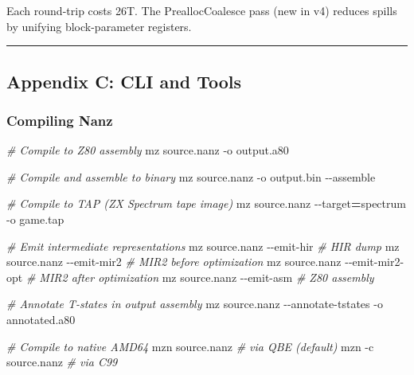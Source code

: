\documentclass[
  11pt,
]{article}
\newenvironment{Shaded}{\begin{snugshade}}{\end{snugshade}}
\newcommand{\AttributeTok}[1]{\textcolor[rgb]{0.13,0.29,0.53}{#1}}
\newcommand{\CommentTok}[1]{\textcolor[rgb]{0.56,0.35,0.01}{\textit{#1}}}
\newcommand{\ExtensionTok}[1]{#1}
\newcommand{\NormalTok}[1]{#1}
\newcommand{\OperatorTok}[1]{\textcolor[rgb]{0.81,0.36,0.00}{\textbf{#1}}}
\begin{document}
Each round-trip costs 26T. The PreallocCoalesce pass (new in v4) reduces
spills by unifying block-parameter registers.

\begin{center}\rule{0.5\linewidth}{0.5pt}\end{center}

\hypertarget{appendix-c-cli-and-tools}{%
\subsection{Appendix C: CLI and Tools}\label{appendix-c-cli-and-tools}}

\hypertarget{compiling-nanz}{%
\subsubsection{Compiling Nanz}\label{compiling-nanz}}

\begin{Shaded}
\begin{Highlighting}[]
\CommentTok{\# Compile to Z80 assembly}
\ExtensionTok{mz}\NormalTok{ source.nanz }\AttributeTok{{-}o}\NormalTok{ output.a80}

\CommentTok{\# Compile and assemble to binary}
\ExtensionTok{mz}\NormalTok{ source.nanz }\AttributeTok{{-}o}\NormalTok{ output.bin }\AttributeTok{{-}{-}assemble}

\CommentTok{\# Compile to TAP (ZX Spectrum tape image)}
\ExtensionTok{mz}\NormalTok{ source.nanz }\AttributeTok{{-}{-}target}\OperatorTok{=}\NormalTok{spectrum }\AttributeTok{{-}o}\NormalTok{ game.tap}

\CommentTok{\# Emit intermediate representations}
\ExtensionTok{mz}\NormalTok{ source.nanz }\AttributeTok{{-}{-}emit{-}hir}        \CommentTok{\# HIR dump}
\ExtensionTok{mz}\NormalTok{ source.nanz }\AttributeTok{{-}{-}emit{-}mir2}       \CommentTok{\# MIR2 before optimization}
\ExtensionTok{mz}\NormalTok{ source.nanz }\AttributeTok{{-}{-}emit{-}mir2{-}opt}   \CommentTok{\# MIR2 after optimization}
\ExtensionTok{mz}\NormalTok{ source.nanz }\AttributeTok{{-}{-}emit{-}asm}        \CommentTok{\# Z80 assembly}

\CommentTok{\# Annotate T{-}states in output assembly}
\ExtensionTok{mz}\NormalTok{ source.nanz }\AttributeTok{{-}{-}annotate{-}tstates} \AttributeTok{{-}o}\NormalTok{ annotated.a80}

\CommentTok{\# Compile to native AMD64}
\ExtensionTok{mzn}\NormalTok{ source.nanz                  }\CommentTok{\# via QBE (default)}
\ExtensionTok{mzn} \AttributeTok{{-}c}\NormalTok{ source.nanz               }\CommentTok{\# via C99}
\end{Highlighting}
\end{Shaded}
\end{document}
